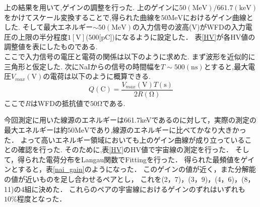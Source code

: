 上の結果を用いて,ゲインの調整を行った.
上のゲインに$50(\mathrm{MeV})/661.7(\mathrm{keV})$をかけてスケール変換することで,得られた曲線を$50\mathrm{MeV}$におけるゲイン曲線とした.
そして最大エネルギー$\sim 50(\mathrm{MeV})$の入力信号の波高($\mathrm{V}$)がWFDの入力電圧の上限の半分程度$1[\mathrm{V}]$($500[\mathrm{pC}$])になるように設定した．
表\ref{HV}が各HV値の調整値を表にしたものである.\\
ここで入力信号の電圧と電荷の関係は以下のように求めた.
まず波形を近似的に三角形と仮定した.
次にNaIからの信号の時間幅を$T\sim 500(\mathrm{ns})$とすると,最大電圧$V_{max}(\mathrm{V})$の電荷は以下のように概算できる.
\begin{equation}
Q(\mathrm{C}) = \frac{V_{max}(\mathrm{V})T(\mathrm{s})}{2 R(\mathrm{\Omega})}
\end{equation}
ここで$R$はWFDの抵抗値で$50\mathrm{\Omega}$である.

今回測定に用いた線源のエネルギーは661.7keVであるのに対して，実際の測定の最大エネルギーは約$50\mathrm{MeV}$であり,線源のエネルギーに比べてかなり大きかった．
よって高いエネルギー領域においても上のゲイン曲線が成り立っていることの確認を行った.
そのために,表\ref{HV}のHV値で宇宙線の測定を行った．
そして，得られた電荷分布をLangau関数でFittingを行った．
得られた最頻値をゲインとすると，表\ref{nai_gain}のようになった．
このゲインの値が近く，また分解能の値が近いものを足し合わせるペアとし，
これを(2，7)，(3，9)，(4，6)，(8，11)の4組に決めた．
これらのペアの宇宙線におけるゲインのずれはいずれも$10\%$程度となった．%

